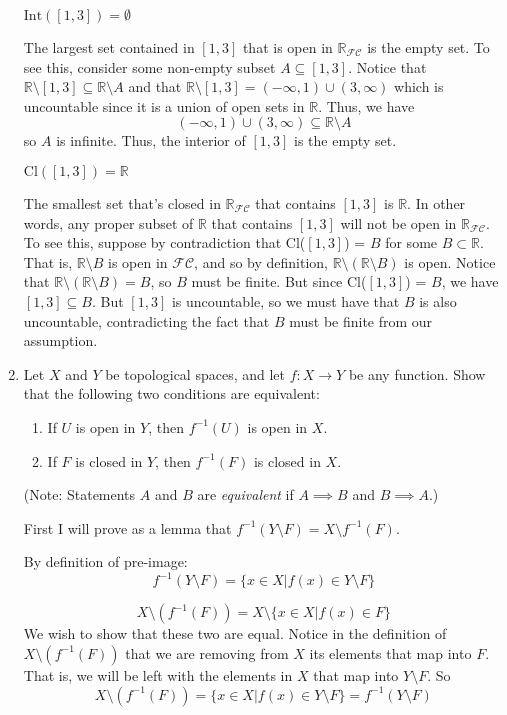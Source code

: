 \documentclass[12pt]{article}
\begin{document}
\begin{enumerate}
$\text{Int}([1,3]) = \emptyset$

The largest set contained in $[1,3]$ that is open in $\mathbb{R}_{\mathcal{FC}}$ is the empty set.
To see this, consider some non-empty subset $A \subseteq [1,3]$. Notice that $\mathbb{R} \setminus [1,3] \subseteq \mathbb{R} \setminus A$ and that $\mathbb{R} \setminus [1,3] = (-\infty, 1) \cup (3, \infty)$ which is uncountable since it is a union of open sets in $\mathbb{R}$. Thus, we have
\[(-\infty, 1) \cup (3, \infty) \subseteq \mathbb{R} \setminus A\]
so $A$ is infinite. 
Thus, the interior of $[1,3]$ is the empty set.

$\text{Cl}([1,3]) = \mathbb{R}$

The smallest set that's closed in $\mathbb{R}_{\mathcal{FC}}$ that contains $[1,3]$ is $\mathbb{R}$. 
In other words, any proper subset of $\mathbb{R}$ that contains $[1,3]$ will not be open in $\mathbb{R}_{\mathcal{FC}}$. 
To see this, suppose by contradiction that Cl($[1,3]$) = $B$ for some $B \subset \mathbb{R}$. 
That is, $\mathbb{R} \setminus B$ is open in $\mathcal{FC}$, and so by definition, $\mathbb{R} \setminus (\mathbb{R} \setminus B)$ is open. 
Notice that $\mathbb{R} \setminus (\mathbb{R} \setminus B) = B$, so $B$ must be finite. 
But since Cl($[1,3]$) = $B$, we have $[1,3] \subseteq B$. 
But 
$[1,3]$ is uncountable, so we must have that $B$ is also uncountable, contradicting the fact that $B$ must be finite from our assumption. 

\item Let $X$ and $Y$ be topological spaces, and let $f:X\to Y$ be any function. Show that the following two conditions are equivalent:
\begin{enumerate}\item If $U$ is open in $Y$, then $f^{-1}(U)$ is open in $X$.
\item If $F$ is closed in $Y$, then $f^{-1}(F)$ is closed in $X$. \end{enumerate}

\noindent (Note: Statements $A$ and $B$ are \textit{equivalent} if $A\implies B$ and $B\implies A$.)

First I will prove as a lemma that $f^{-1}(Y \setminus F) = X \setminus f^{-1}(F)$.

By definition of pre-image:
\[f^{-1}(Y \setminus F) = \{x \in X | f(x) \in Y \setminus F\} \]

\[X \setminus (f^{-1}(F)) = X \setminus \{x \in X | f(x) \in F\}\]
We wish to show that these two are equal. 
Notice in the definition of $X \setminus (f^{-1}(F))$ that we are removing from $X$ its elements that map into $F$. 
That is, we will be left with the elements in $X$ that map into $Y \setminus F$.
So 
\[X \setminus (f^{-1}(F)) = \{x \in X | f(x) \in Y \setminus F\} = f^{-1}(Y \setminus F)\]


\end{enumerate}
\end{document}
